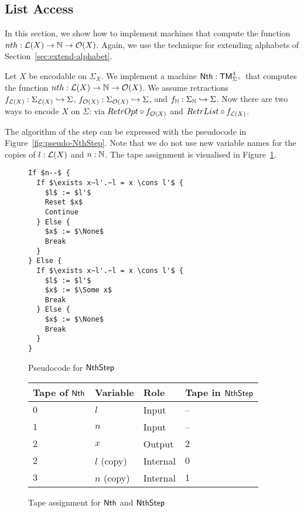 \subsection{List Access}
\label{sec:Nth}
%

In this section, we show how to implement machines that compute the function $nth : \mathcal{L}(X) \rightarrow \mathbb{N} \rightarrow \mathcal{O}(X)$.  Again, we use the technique
for extending alphabets of Section~\ref{sec:extend-alphabet}.

Let $X$ be encodable on $\Sigma_X$.  We implement a machine $\mathsf{Nth} : \mathsf{TM}_{\Sigma^+}^4$ that computes the function
$nth : \mathcal{L}(X) \rightarrow \mathbb{N} \rightarrow \mathcal{O}(X)$.  We assume retractions $f_{\mathcal{L}(X)} : \Sigma_{\mathcal{L}(X)} \hookrightarrow \Sigma$,
$f_{\mathcal{O}(X)} : \Sigma_{\mathcal{O}(X)} \hookrightarrow \Sigma$, and $f_{\mathbb{N}} : \Sigma_{\mathbb{N}} \hookrightarrow \Sigma$.  Now there are two ways to encode
$X$ on $\Sigma$: via $RetrOpt \circ f_{\mathcal{O}(X)}$ and $RetrList \circ f_{\mathcal{L}(X)}$.

The algorithm of the step can be expressed with the pseudocode in Figure~\ref{fig:pseudo-NthStep}.  Note that we do not use new variable names for the
copies of $l:\mathcal{L}(X)$ and $n:\mathbb{N}$.  The tape assignment is visualised in Figure~\ref{fig:tapes-Nth}.

\begin{figure}[!htb]
  \begin{minipage}{0.3\textwidth}
    \small
\begin{lstlisting}[style=pseudocode]
If $n--$ {
  If $\exists x~l'.~l = x \cons l'$ {
    $l$ := $l'$
    Reset $x$
    Continue
  } Else {
    $x$ := $\None$
    Break
  }
} Else {
  If $\exists x~l'.~l = x \cons l'$ {
    $l$ := $l'$
    $x$ := $\Some x$
    Break
  } Else {
    $x$ := $\None$
    Break
  }
}
\end{lstlisting}
    \caption{Pseudocode for $\mathsf{NthStep}$}
    \label{fig:pseudo-NthStep}
  \end{minipage}%
  \begin{minipage}{0.7\textwidth}
    \begin{tabular}{l|l|l|l}
      Tape of $\mathsf{Nth}$ & Variable & Role & Tape in $\mathsf{NthStep}$ \\ \hline
      $0$ & $l$        & Input    & --  \\
      $1$ & $n$        & Input    & --  \\
      $2$ & $x$        & Output   & $2$ \\
      $2$ & $l$ (copy) & Internal & $0$ \\
      $3$ & $n$ (copy) & Internal & $1$ \\
    \end{tabular}
    \caption{Tape assignment for $\mathsf{Nth}$ and $\mathsf{NthStep}$}
    \label{fig:tapes-Nth}
  \end{minipage}
\end{figure}



